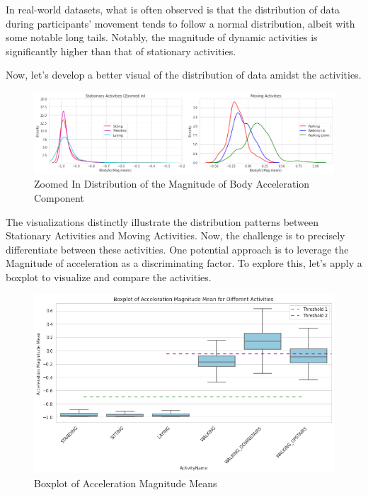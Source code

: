 \documentclass[11pt]{article}
\begin{document}
In real-world datasets, what is often observed is that the distribution of data during participants' movement tends to follow a normal distribution, albeit with some notable long tails. Notably, the magnitude of dynamic activities is significantly higher than that of stationary activities.  \newline 

Now, let's develop a better visual of the distribution of data amidst the activities. \newline 

\begin{figure}[h!]
	\includegraphics[width= 1.0 \linewidth]{zoomed_distribution_acc_activity.png}
	\centering
	\caption{Zoomed In Distribution of the Magnitude of Body Acceleration Component}
	\label{zoomed_distribution_acc_activity.png}
\end{figure}

The visualizations distinctly illustrate the distribution patterns between Stationary Activities and Moving Activities. Now, the challenge is to precisely differentiate between these activities. One potential approach is to leverage the Magnitude of acceleration as a discriminating factor. To explore this, let's apply a boxplot to visualize and compare the activities.

\begin{figure}[h!]
	\includegraphics[width= 1.0 \linewidth]{boxplot_acc_magnitude_mean.png}
	\centering
	\caption{Boxplot of Acceleration Magnitude Means}
	\label{boxplot_acc_magnitude_mean.png}
\end{figure}
\end{document}
